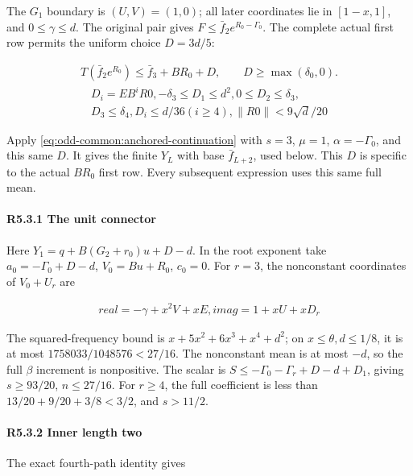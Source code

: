 The \(G_1\) boundary is \((U,\allowbreak \allowbreak  V)=(1,\allowbreak \allowbreak  0)\); all later coordinates lie in \([1-x,\allowbreak \allowbreak  1]\), and \(0\le\gamma\le d\). The original pair gives \(F\le\bar f_2e^{R_0-\Gamma_0}\). The complete actual first row permits the uniform choice \(D=3d/5\):

\[
\begin{gathered}
T(\bar f_2 e^{R_0})\le \bar f_3+BR_0+D,
\qquad D\ge\max(\delta_0,0).
\end{gathered}\tag{R5.3.1}
\]
\[
\begin{gathered}
D_i=EB^iR0,-\delta_3\le D_1\le d^2,0\le D_2\le \delta_3,\\
D_3\le \delta_4,D_i\le d/36(i\ge 4),\|R0\|<9\sqrt{d}/20
\end{gathered}
\]

Apply \eqref{eq:odd-common:anchored-continuation} with
\(s=3\), \(\mu=1\), \(\alpha=-\Gamma_0\), and this same \(D\).
It gives the finite \(Y_L\) with base \(\bar f_{L+2}\), used below.
This \(D\) is specific to the actual \(BR_0\) first row. Every subsequent expression uses this same full mean.

\paragraph{R5.3.1 The unit connector}\label{part:R5.3.1}

Here \(Y_1=q+B(G_2+r_0)u+D-d\). In the root exponent take \(a_0=-\Gamma_0+D-d\), \(V_0=Bu+R_0\), \(c_0=0\). For \(r=3\), the nonconstant coordinates of \(V_0+U_r\) are

\[
\begin{gathered}
real=-\gamma+x^2V+xE,imag=1+xU+xD_r
\end{gathered}
\]

The squared-frequency bound is \(x+5x^2+6x^3+x^4+d^2\); on \(x\le\theta,\allowbreak \allowbreak  d\le1/8\), it is at most \(1758033/1048576<27/16\). The nonconstant mean is at most \(-d\), so the full \(\beta\) increment is nonpositive. The scalar is \(S\le-\Gamma_0-\Gamma_r+D-d+D_1\), giving \(s\ge93/20\), \(n\le27/16\). For \(r\ge4\), the full coefficient is less than \(13/20+9/20+3/8<3/2\), and \(s>11/2\).

\paragraph{R5.3.2 Inner length two}\label{part:R5.3.2}

The exact fourth-path identity gives

